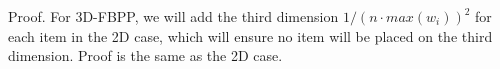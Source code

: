 \hspace{-1em}Proof. For 3D-FBPP, we will add the third dimension $1/(n \cdot max({w_i}))^2$ for each item in the 2D case, which will ensure no item will be placed on the third dimension. Proof is the same as the 2D case.

